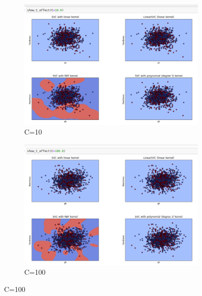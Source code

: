\documentclass{article}
\begin{document}
\begin{figure}[!h]
	\centering
	\begin{subfigure}[b]{0.4\textwidth}
		\centering
		\includegraphics[width=\textwidth]{../resultats/C=10}
		\caption*{C=10}
		\label{fig:knn}
	\end{subfigure}
	\begin{subfigure}[b]{0.4\textwidth}
		\centering
		\includegraphics[width=\textwidth]{../resultats/C=100}
		\caption*{C=100}
		\label{fig:three sin x}
	\end{subfigure}
\end{figure}
\end{document}
